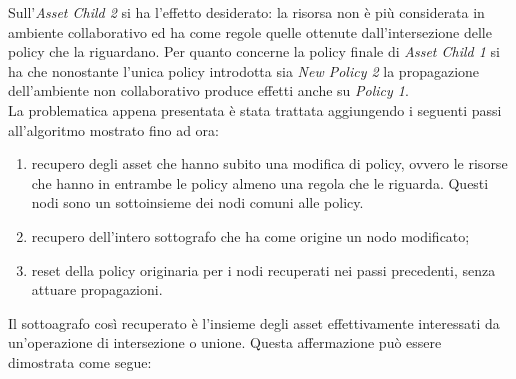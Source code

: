 \documentclass[12pt,a4paper,twoside]{book}
\begin{document}
Sull'\textit{Asset Child 2} si ha l'effetto desiderato: la risorsa non è più considerata in ambiente collaborativo ed ha come regole quelle ottenute dall'intersezione delle policy che la riguardano. Per quanto concerne la policy finale di \textit{Asset Child 1} si ha che nonostante l'unica policy introdotta sia \textit{New Policy 2} la propagazione dell'ambiente non collaborativo produce effetti anche su \textit{Policy 1}.\\
La problematica appena presentata è stata trattata aggiungendo i seguenti passi all'algoritmo mostrato fino ad ora:
\begin{enumerate}
\item recupero degli asset che hanno subito una modifica di policy, ovvero le risorse che hanno in entrambe le policy almeno una regola che le riguarda. Questi nodi sono un sottoinsieme dei nodi comuni alle policy.
\item recupero dell'intero sottografo che ha come origine un nodo modificato;
\item reset della policy originaria per i nodi recuperati nei passi precedenti, senza attuare propagazioni.
\end{enumerate}
Il sottoagrafo così recuperato è l'insieme degli asset effettivamente interessati da un'operazione di intersezione o unione. Questa affermazione può essere dimostrata come segue:
\end{document}
